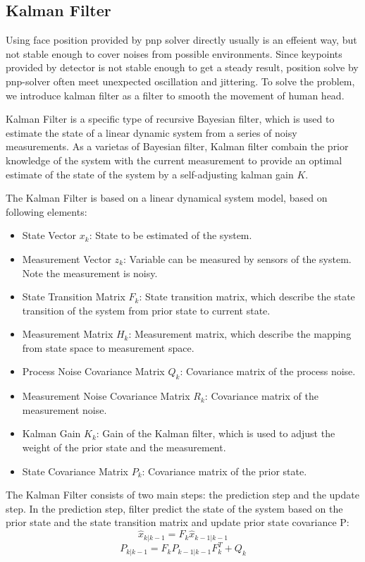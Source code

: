 \subsection{Kalman Filter}
Using face position provided by pnp solver directly usually is an effeient way, but not stable enough to cover noises from possible environments.  Since keypoints provided by detector is not stable enough to get a steady result, position solve by pnp-solver often meet unexpected oscillation and jittering. To solve the problem, we introduce kalman filter as a filter to smooth the movement of human head. 

Kalman Filter is a specific type of recursive Bayesian filter, which is used to estimate the state of a linear dynamic system from a series of noisy measurements. As a varietas of Bayesian filter, Kalman filter combain the prior knowledge of the system with the current measurement to provide an optimal estimate of the state of the system by a self-adjusting kalman gain $K$. 

The Kalman Filter is based on a linear dynamical system model, based on following elements:
\begin{itemize}
    \item State Vector $x_k$: State to be estimated of the  system.
    \item Measurement Vector $z_k$: Variable can be measured by sensors of the system. Note the measurement is noisy.
    \item State Transition Matrix $F_k$: State transition matrix, which describe the state transition of the system from prior state to current state.
    \item Measurement Matrix $H_k$: Measurement matrix, which describe the mapping from state space to measurement space.
    \item Process Noise Covariance Matrix $Q_k$: Covariance matrix of the process noise.
    \item Measurement Noise Covariance Matrix $R_k$: Covariance matrix of the measurement noise.
    \item Kalman Gain $K_k$: Gain of the Kalman filter, which is used to adjust the weight of the prior state and the measurement.
    \item State Covariance Matrix $P_k$: Covariance matrix of the prior state.
\end{itemize}

The Kalman Filter consists of two main steps: the prediction step and the update step. In the prediction step, filter predict the state of the system based on the prior state and the state transition matrix and update prior state covariance P:
\begin{equation}
    \hat{x}_{k|k-1} = F_k \hat{x}_{k-1|k-1} 
\end{equation}
\begin{equation}
    P_{k|k-1} = F_k P_{k-1|k-1} F_k^T + Q_k
\end{equation}


